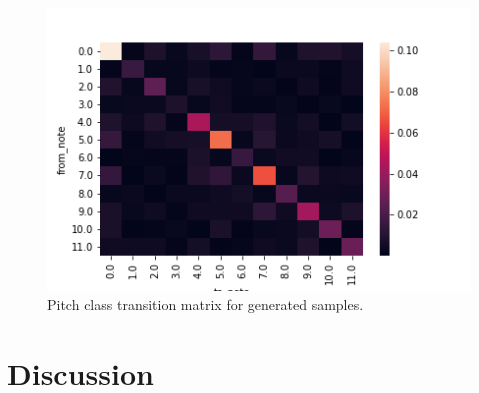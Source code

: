 \documentclass[sigconf,authorversion]{acmart}
\begin{document}
\begin{figure}[htbp]
  \centering
  \includegraphics[width=\linewidth]{figures/pctm_generated.png}
  \caption{Pitch class transition matrix for generated samples.}
  \label{pctm_generated}
\end{figure}

\section{Discussion}



\end{document}
